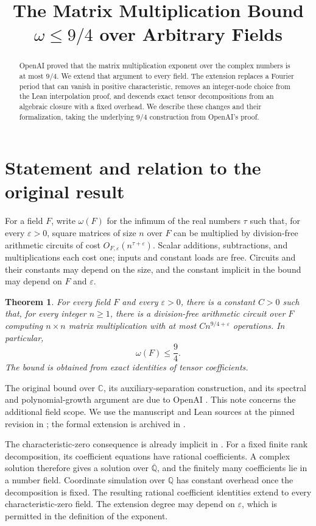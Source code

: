 \documentclass[11pt]{article}
\title{The Matrix Multiplication Bound\\$\omega\leq9/4$ over Arbitrary Fields}
\author{}
\date{}
\newtheorem{theorem}{Theorem}[section]
\theoremstyle{remark}
\newcommand{\C}{\mathbb C}
\newcommand{\Q}{\mathbb Q}
\newcommand{\eps}{\varepsilon}
\numberwithin{equation}{section}
\begin{document}
\maketitle

\begin{abstract}
OpenAI proved that the matrix multiplication exponent over the complex
numbers is at most $9/4$. We extend that argument to every field. The
extension replaces a Fourier period that can vanish in positive
characteristic, removes an integer-node choice from the Lean interpolation
proof, and descends exact tensor decompositions from an algebraic closure
with a fixed overhead. We describe these changes and their formalization,
taking the underlying $9/4$ construction from OpenAI's proof.
\end{abstract}

\section{Statement and relation to the original result}

For a field $F$, write $\omega(F)$ for the infimum of the real numbers
$\tau$ such that, for every $\eps>0$, square matrices of size $n$ over $F$
can be multiplied by division-free arithmetic circuits of cost
$O_{F,\eps}(n^{\tau+\eps})$. Scalar additions, subtractions, and
multiplications each cost one; inputs and constant loads are free.
Circuits and their constants may depend on the size, and the constant
implicit in the bound may depend on $F$ and $\eps$.

\begin{theorem}\label{thm:main}
For every field $F$ and every $\eps>0$, there is a constant $C>0$ such
that, for every integer $n\geq1$, there is a division-free arithmetic
circuit over $F$ computing $n\times n$ matrix multiplication with at
most $Cn^{9/4+\eps}$ operations. In particular,
\[
\omega(F)\leq\frac94.
\]
The bound is obtained from exact identities of tensor coefficients.
\end{theorem}

The original bound over $\C$, its auxiliary-separation construction, and
its spectral and polynomial-growth argument are due to OpenAI
\cite{OAI}. This note concerns the additional field scope. We use the
manuscript and Lean sources at the pinned revision in \cite{OAI,OAILean};
the formal extension is archived in \cite{Formalization}.

The characteristic-zero consequence is already implicit in
\cite[Remark~5.2]{OAI}. For a fixed finite rank decomposition, its
coefficient equations have rational coefficients. A complex solution
therefore gives a solution over $\overline{\Q}$, and the finitely many
coefficients lie in a number field. Coordinate simulation over $\Q$
has constant overhead once the decomposition is fixed. The resulting
rational coefficient identities extend to every characteristic-zero
field. The extension degree may depend on $\eps$, which is permitted
in the definition of the exponent.
\end{document}
